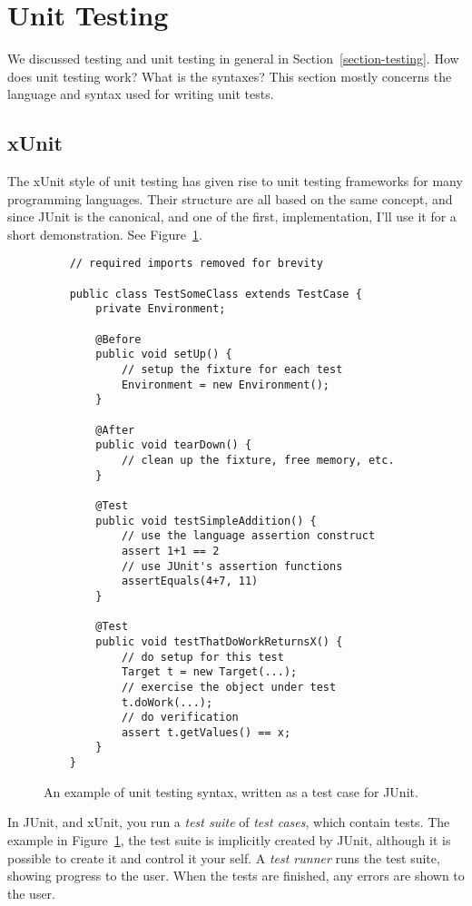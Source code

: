 \documentclass[a4paper,11pt]{kth-mag}
\begin{document}
\section{Unit Testing} \label{section-unit-testing}

We discussed testing and unit testing in general in
Section~\ref{section-testing}. How does unit testing work? What is the
syntaxes? This section mostly concerns the language and syntax used for writing
unit tests.

\subsection{xUnit}

The xUnit style of unit testing \cite{fowlerxunit} has given rise to unit
testing frameworks for many programming languages. Their structure are all
based on the same concept, and since JUnit is the canonical, and one of the
first, implementation, I'll use it for a short demonstration. See
Figure~\ref{figure-junit}.

\begin{figure}[h!]
	\lstset{language=Java}
	\begin{lstlisting}
	// required imports removed for brevity

	public class TestSomeClass extends TestCase {
		private Environment;

		@Before
		public void setUp() {
			// setup the fixture for each test
			Environment = new Environment();
		}

		@After
		public void tearDown() {
			// clean up the fixture, free memory, etc.
		}

		@Test
		public void testSimpleAddition() {
			// use the language assertion construct
			assert 1+1 == 2
			// use JUnit's assertion functions
			assertEquals(4+7, 11)
		}

		@Test
		public void testThatDoWorkReturnsX() {
			// do setup for this test
			Target t = new Target(...);
			// exercise the object under test
			t.doWork(...);
			// do verification
			assert t.getValues() == x;
		}
	}
	\end{lstlisting}
	\caption{An example of unit testing syntax, written as a test case for JUnit.}
	\label{figure-junit}
\end{figure}

In JUnit, and xUnit, you run a \textit{test suite} of \textit{test cases},
which contain tests. The example in Figure~\ref{figure-junit}, the test suite
is implicitly created by JUnit, although it is possible to create it and
control it your self. A \textit{test runner} runs the test suite, showing
progress to the user.  When the tests are finished, any errors are shown to the
user.
\end{document}
